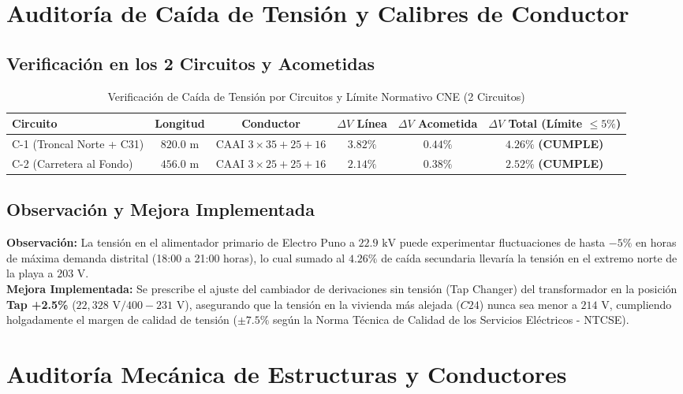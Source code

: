 \documentclass[12pt,a4paper]{report}
\begin{document}
\section{Auditoría de Caída de Tensión y Calibres de Conductor}
\subsection{Verificación en los 2 Circuitos y Acometidas}
\begin{table}[H]
\centering
\caption{Verificación de Caída de Tensión por Circuitos y Límite Normativo CNE (2 Circuitos)}
\label{tab:auditoria_tension}
\small
\begin{tabularx}{\linewidth}{L c c c c C}
\toprule
\textbf{Circuito} & \textbf{Longitud} & \textbf{Conductor} & \textbf{$\Delta V$ Línea} & \textbf{$\Delta V$ Acometida} & \textbf{$\Delta V$ Total (Límite $\le 5\%$)} \\
\midrule
C-1 (Troncal Norte + C31) & $820.0\text{ m}$ & CAAI $3\times35+25+16$ & $3.82\%$ & $0.44\%$ & $\mathbf{4.26\%}$ \textbf{(CUMPLE)} \\
C-2 (Carretera al Fondo)  & $456.0\text{ m}$ & CAAI $3\times25+25+16$ & $2.14\%$ & $0.38\%$ & $\mathbf{2.52\%}$ \textbf{(CUMPLE)} \\
\bottomrule
\end{tabularx}
\end{table}

\subsection{Observación y Mejora Implementada}
\textbf{Observación:} La tensión en el alimentador primario de Electro Puno a $22.9\text{ kV}$ puede experimentar fluctuaciones de hasta $-5\%$ en horas de máxima demanda distrital (18:00 a 21:00 horas), lo cual sumado al $4.26\%$ de caída secundaria llevaría la tensión en el extremo norte de la playa a $203\text{ V}$.\\
\textbf{Mejora Implementada:} Se prescribe el ajuste del cambiador de derivaciones sin tensión (Tap Changer) del transformador en la posición \textbf{Tap +2.5\%} ($22,328\text{ V} / 400 - 231\text{ V}$), asegurando que la tensión en la vivienda más alejada ($C24$) nunca sea menor a $214\text{ V}$, cumpliendo holgadamente el margen de calidad de tensión ($\pm 7.5\%$ según la Norma Técnica de Calidad de los Servicios Eléctricos - NTCSE).

\section{Auditoría Mecánica de Estructuras y Conductores}
\end{document}
